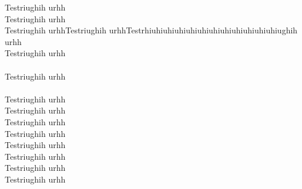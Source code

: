 
Testriughih urhh\\
Testriughih urhh\\
Testriughih urhhTestriughih urhhTestrhiuhiuhiuhiuhiuhiuhiuhiuhiuhiuhiuhiughih urhh\\
Testriughih urhh\\
\\
Testriughih urhh\\
\\
Testriughih urhh\\
Testriughih urhh\\
Testriughih urhh\\
Testriughih urhh\\
Testriughih urhh\\
Testriughih urhh\\
Testriughih urhh\\
Testriughih urhh